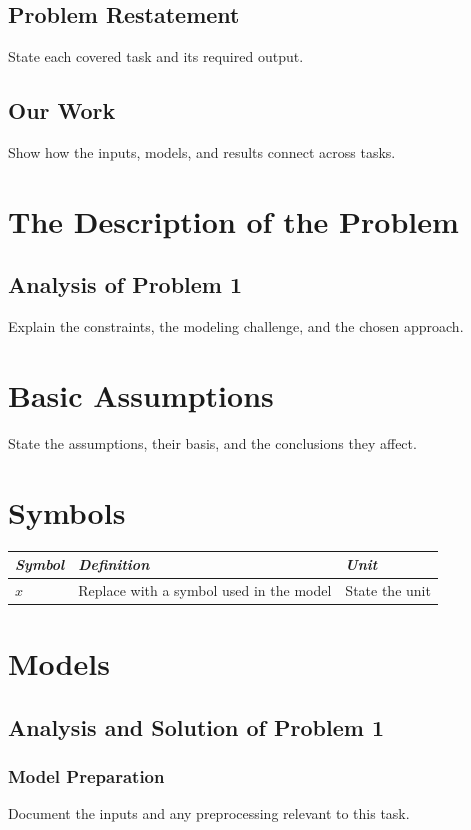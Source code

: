 \documentclass[12pt,a4paper]{article}
\begin{document}
\subsection{Problem Restatement}
State each covered task and its required output.
\subsection{Our Work}
Show how the inputs, models, and results connect across tasks.

\section{The Description of the Problem}
\subsection{Analysis of Problem 1}
Explain the constraints, the modeling challenge, and the chosen approach.

\section{Basic Assumptions}
State the assumptions, their basis, and the conclusions they affect.

\section{Symbols}
\begin{table}[!ht]
  \centering
  \begin{tabularx}{\linewidth}{@{}lXl@{}}
    \toprule
    \textbf{\textit{Symbol}} & \textbf{\textit{Definition}} & \textbf{\textit{Unit}} \\
    \midrule
    $x$ & Replace with a symbol used in the model & State the unit \\
    \bottomrule
  \end{tabularx}
\end{table}

\section{Models}
\subsection{Analysis and Solution of Problem 1}
\subsubsection{Model Preparation}
Document the inputs and any preprocessing relevant to this task.
\end{document}
